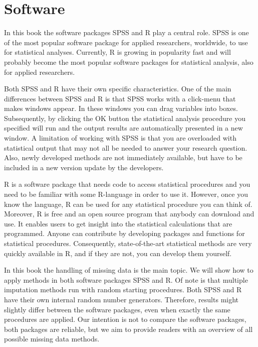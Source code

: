 \documentclass[]{book}
\begin{document}
\section*{Software}\label{software}

In this book the software packages SPSS and R play a central role. SPSS
is one of the most popular software package for applied researchers,
worldwide, to use for statistical analyses. Currently, R is growing in
popularity fast and will probably become the most popular software
packages for statistical analysis, also for applied researchers.

Both SPSS and R have their own specific characteristics. One of the main
differences between SPSS and R is that SPSS works with a click-menu that
makes windows appear. In these windows you can drag variables into
boxes. Subsequently, by clicking the OK button the statistical analysis
procedure you specified will run and the output results are
automatically presented in a new window. A limitation of working with
SPSS is that you are overloaded with statistical output that may not all
be needed to answer your research question. Also, newly developed
methods are not immediately available, but have to be included in a new
version update by the developers.

R is a software package that needs code to access statistical procedures
and you need to be familiar with some R-language in order to use it.
However, once you know the language, R can be used for any statistical
procedure you can think of. Moreover, R is free and an open source
program that anybody can download and use. It enables users to get
insight into the statistical calculations that are programmed. Anyone
can contribute by developing packages and functions for statistical
procedures. Consequently, state-of-the-art statistical methods are very
quickly available in R, and if they are not, you can develop them
yourself.

In this book the handling of missing data is the main topic. We will
show how to apply methods in both software packages SPSS and R. Of note
is that multiple imputation methods run with random starting procedures.
Both SPSS and R have their own internal random number generators.
Therefore, results might slightly differ between the software packages,
even when exactly the same procedures are applied. Our intention is not
to compare the software packages, both packages are reliable, but we aim
to provide readers with an overview of all possible missing data
methods.
\end{document}
